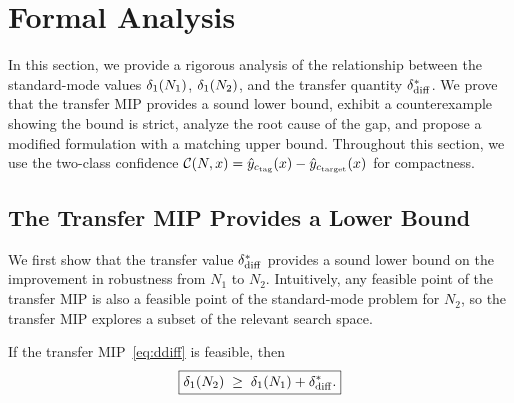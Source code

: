 \section{Formal Analysis}
\label{sec:formal}

In this section, we provide a rigorous analysis of the relationship between the standard-mode values $\delta_1(N_{1})$, $\delta_1(N_{2})$, and the transfer quantity $\delta_{\mathrm{diff}}^{*}$. We prove that the transfer MIP provides a sound lower bound, exhibit a counterexample showing the bound is strict, analyze the root cause of the gap, and propose a modified formulation with a matching upper bound. Throughout this section, we use the two-class confidence $\mathcal{C}(N,x) = \hat{y}_{c_\mathrm{tag}}(x) - \hat{y}_{c_\mathrm{target}}(x)$ for compactness.

\subsection{The Transfer MIP Provides a Lower Bound}
\label{sec:formal:correct}

We first show that the transfer value $\delta_{\mathrm{diff}}^{*}$ provides a sound lower bound on the improvement in robustness from $N_1$ to $N_2$. Intuitively, any feasible point of the transfer MIP is also a feasible point of the standard-mode problem for $N_2$, so the transfer MIP explores a subset of the relevant search space.

\begin{theorem}
  \label{thm:correct}
  If the transfer MIP~\eqref{eq:ddiff} is feasible, then
  \[
    \boxed{\delta_1(N_{2}) \;\geq\; \delta_1(N_{1}) + \delta_{\mathrm{diff}}^{*}.}
  \]
\end{theorem}


